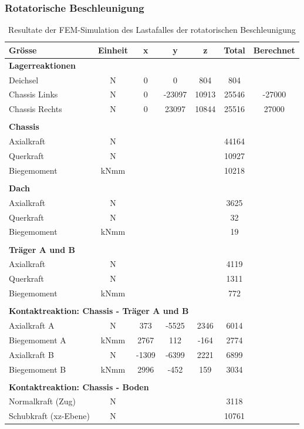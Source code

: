 \subsubsection{Rotatorische Beschleunigung}
\begin{table}[H]
\centering
\begin{tabular}{lcccccc}
Grösse	&	Einheit	&	x	&	y	&	z	&	Total	&	Berechnet	\\	\hline
\multicolumn{5}{l}{\textbf{Lagerreaktionen}}									&		&		\\	\thickhline
Deichsel	&	N	&	0	&	0	&	804	&	804	&		\\
Chassis Links	&	N	&	0	&	-23097	&	10913	&	25546	&	-27000	\footnotemark \\
Chassis Rechts	&	N	&	0	&	23097	&	10844	&	25516	&	27000	\\	\hline	\\
\multicolumn{5}{l}{\textbf{Chassis}}									&		&		\\	\thickhline
Axialkraft	&	N	&		&		&		&	44164	&		\\
Querkraft	&	N	&		&		&		&	10927	&		\footnotemark \\
Biegemoment	&	kNmm	&		&		&		&	10218	&		\\	\hline	\\
\multicolumn{5}{l}{\textbf{Dach}}									&		&		\\	\thickhline
Axialkraft	&	N	&		&		&		&	3625	&		\\
Querkraft	&	N	&		&		&		&	32	&		\\
Biegemoment	&	kNmm	&		&		&		&	19	&		\\	\hline	\\
\multicolumn{5}{l}{\textbf{Träger A und B}}													\\	\thickhline
Axialkraft	&	N	&		&		&		&	4119	&		\\
Querkraft	&	N	&		&		&		&	1311	&		\\
Biegemoment	&	kNmm	&		&		&		&	772	&		\\	\hline	\\
\multicolumn{5}{l}{\textbf{Kontaktreaktion: Chassis - Träger A und B}}									&		&		\\	\thickhline
 Axialkraft A	&	N	&	373	&	-5525	&	2346	&	6014	&		\\
Biegemoment A	&	kNmm	&	2767	&	112	&	-164	&	2774	&		\\
Axialkraft B	&	N	&	-1309	&	-6399	&	2221	&	6899	&		\\
Biegemoment B	&	kNmm	&	2996	&	-452	&	159	&	3034	&		\\	\hline	\\
\multicolumn{5}{l}{\textbf{Kontaktreaktion: Chassis - Boden}}									&		&		\\	\thickhline
Normalkraft (Zug)	&	N	&		&		&		&	3118	&		\\
Schubkraft (xz-Ebene)	&	N	&		&		&		&	10761	&		\\	\hline
\end{tabular}
\caption{Resultate der FEM-Simulation des Lastafalles der rotatorischen Beschleunigung}
\label{tab:FEM 1.5}
\end{table}

